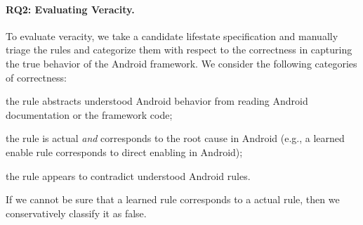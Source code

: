 \documentclass[10pt,reprint,nocopyrightspace,numbers]{sigplanconf}
\begin{document}
%
%
%
%
%


\paragraph{RQ2: Evaluating Veracity.}

\newcommand{\veraactual}{actual}
\newcommand{\veraimplied}{implied}
\newcommand{\veratrueimplied}{not false}
\newcommand{\verafalse}{false}

To evaluate veracity, we take a candidate lifestate specification and manually triage the rules and categorize them with respect to the correctness in capturing the true behavior of the Android framework.
We consider the following categories of correctness:
\begin{inparadesc}
\item[(actual)] the rule abstracts understood Android behavior from reading Android documentation or the framework code;
\item[(direct)] the rule is actual \emph{and} corresponds to the root cause in Android (e.g., a learned enable rule corresponds to direct enabling in Android);
\item[(false or unknown)] the rule appears to contradict understood Android rules.
\end{inparadesc}
If we cannot be sure that a learned rule corresponds to a \veraactual{} rule, then we conservatively classify it as \verafalse{}.
\end{document}
